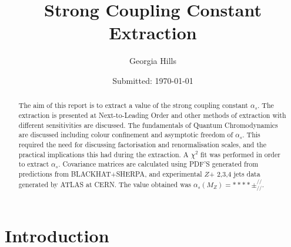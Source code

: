 \documentclass[12pt, onecolumn]{revtex4}    %
\begin{document}
                     


\title{Strong Coupling Constant Extraction} 
\date{Submitted: \today{}}
\author{Georgia Hills}

\begin{abstract}              
 The aim of this report is to extract a value of the strong coupling constant ${\alpha_s}$. The extraction is presented at Next-to-Leading Order and other methods of extraction with different sensitivities are discussed. The fundamentals of Quantum Chromodynamics are discussed including colour confinement and asymptotic freedom of ${\alpha_s}$. This required the need for discussing factorisation and renormalisation scales, and the practical implications this had during the extraction. A ${\chi^2}$  fit was performed in order to extract ${\alpha_s}$. Covariance matrices are calculated using PDF'S generated from predictions from BLACKHAT+SHERPA, and experimental ${Z}$+ 2,3,4 jets data generated by ATLAS at CERN.  The value obtained was ${\alpha_s(M_Z) = **** \pm ^{//}_{//}}$.


\end{abstract}


\maketitle


\tableofcontents

\newpage


\section{Introduction} 
\end{document}
